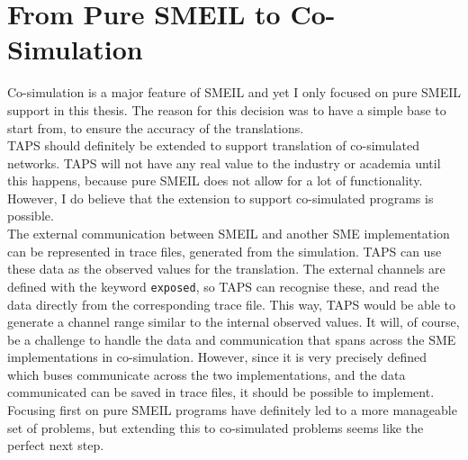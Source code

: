 \section{From Pure SMEIL to Co-Simulation}
Co-simulation is a major feature of SMEIL and yet I only focused on pure SMEIL support in this thesis. The reason for this decision was to have a simple base to start from, to ensure the accuracy of the translations.\\

TAPS should definitely be extended to support translation of co-simulated networks. TAPS will not have any real value to the industry or academia until this happens, because pure SMEIL does not allow for a lot of functionality.
However, I do believe that the extension to support co-simulated programs is possible.\\

The external communication between SMEIL and another SME implementation can be represented in trace files, generated from the simulation. TAPS can use these data as the observed values for the translation. The external channels are defined with the keyword \texttt{exposed}, so TAPS can recognise these, and read the data directly from the corresponding trace file. This way, TAPS would be able to generate a channel range similar to the internal observed values.
It will, of course, be a challenge to handle the data and communication that spans across the SME implementations in co-simulation. However, since it is very precisely defined which buses communicate across the two implementations, and the data communicated can be saved in trace files, it should be possible to implement.\\

Focusing first on pure SMEIL programs have definitely led to a more manageable set of problems, but extending this to co-simulated problems seems like the perfect next step.

